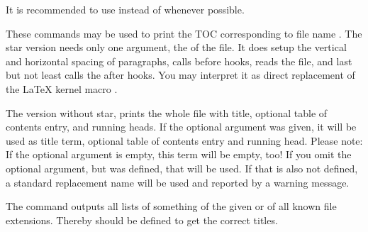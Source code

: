 It is recommended to use  instead
of  whenever possible.
\EndIndexGroup


\begin{Declaration}
\end{Declaration}
These commands may be used to print the TOC corresponding to file name
. The star version
 needs only one argument, the  of the
file. It does setup the vertical and horizontal spacing of paragraphs, calls
before hooks, reads the file, and last but not least calls the after hooks.
You may interpret it as direct replacement of the \LaTeX{} kernel macro
.

The version without star, prints the whole file
with title, optional table of contents entry, and running heads. If the
optional argument  was given, it will be used as
title term, optional table of contents entry and running head. Please
note: If the optional argument is empty, this term will
be empty, too! If you omit the optional argument, but
 was defined, that will be used. If that is
also not defined, a standard replacement name will be used and reported by a
warning message.

The command  outputs all
lists of something of the given  or of all known file
extensions. Thereby
 should be defined to get the correct
titles.

